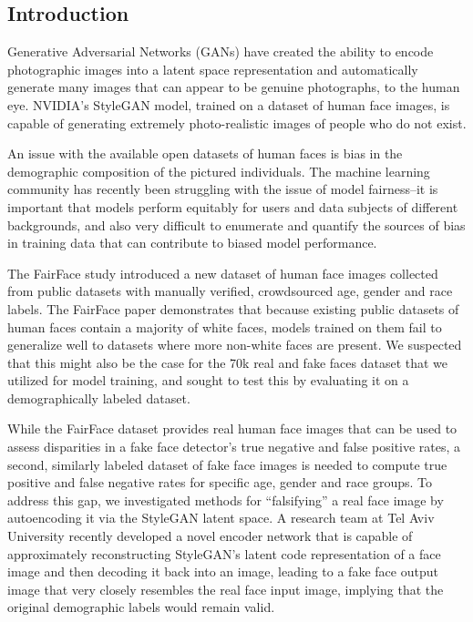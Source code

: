\documentclass[11pt, letterpaper]{article}
\begin{document}
\begin{multicols}{2}
  \section{Introduction}

  Generative Adversarial Networks (GANs) have created the ability to
  encode photographic images into a latent space representation and
  automatically generate many images that can appear to be genuine
  photographs, to the human eye. NVIDIA's StyleGAN\cite{stylegan} model, trained
  on a dataset of human face images, is capable of generating extremely
  photo-realistic images of people who do not exist.

  An issue with the available open datasets of human faces is bias in the
  demographic composition of the pictured individuals. The machine learning
  community has recently been struggling with the issue of model fairness--it is
  important that models perform equitably for users and data subjects of 
  different backgrounds, and also very difficult to enumerate and quantify the 
  sources of bias in training data that can contribute to biased model
  performance.

  The FairFace\cite{karkkainen2019fairface} study introduced a new dataset of
  human face images collected from public datasets with manually verified,
  crowdsourced age, gender and race labels. The FairFace paper demonstrates that
  because existing public datasets of human faces contain a majority of white
  faces, models trained on them fail to generalize well to datasets where more
  non-white faces are present. We suspected that this might also be the case for
  the 70k real and fake faces dataset that we utilized for model training, and
  sought to test this by evaluating it on a demographically labeled dataset.

  While the FairFace dataset provides real human face images that can be used to
  assess disparities in a fake face detector's true negative and false positive
  rates, a second, similarly labeled dataset of fake face images is needed to
  compute true positive and false negative rates for specific age, gender and
  race groups. To address this gap, we investigated methods for ``falsifying'' a
  real face image by autoencoding it via the StyleGAN latent space. A research
  team at Tel Aviv University recently developed a novel encoder
  network\cite{richardson2020encoding} that is capable of approximately
  reconstructing StyleGAN's latent code representation of a face image and then
  decoding it back into an image, leading to a fake face output image that very
  closely resembles the real face input image, implying that the original
  demographic labels would remain valid.


\end{multicols}
\end{document}
